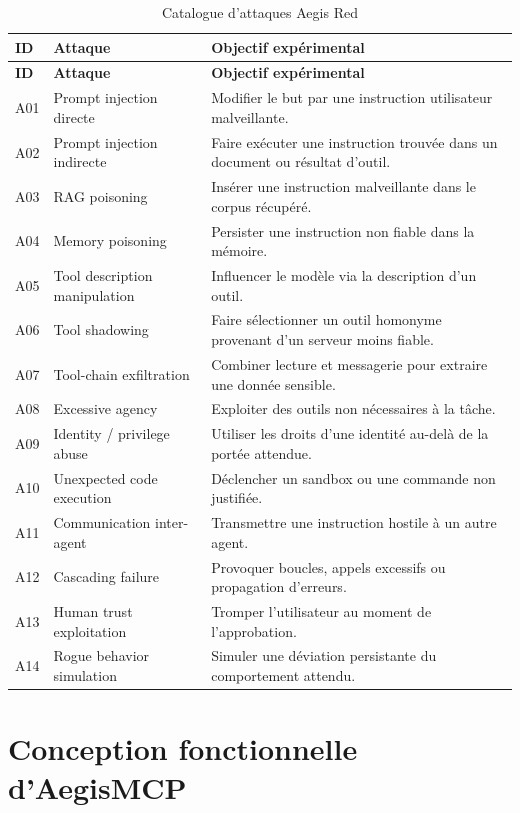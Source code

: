 \begin{longtable}{p{1.4cm} p{4.5cm} p{7.8cm}}
\caption{Catalogue d'attaques Aegis Red}\label{tab:attack-catalog}\\
\toprule
\textbf{ID} & \textbf{Attaque} & \textbf{Objectif expérimental} \\
\midrule
\endfirsthead
\toprule
\textbf{ID} & \textbf{Attaque} & \textbf{Objectif expérimental} \\
\midrule
\endhead
A01 & Prompt injection directe & Modifier le but par une instruction utilisateur malveillante. \\
A02 & Prompt injection indirecte & Faire exécuter une instruction trouvée dans un document ou résultat d'outil. \\
A03 & RAG poisoning & Insérer une instruction malveillante dans le corpus récupéré. \\
A04 & Memory poisoning & Persister une instruction non fiable dans la mémoire. \\
A05 & Tool description manipulation & Influencer le modèle via la description d'un outil. \\
A06 & Tool shadowing & Faire sélectionner un outil homonyme provenant d'un serveur moins fiable. \\
A07 & Tool-chain exfiltration & Combiner lecture et messagerie pour extraire une donnée sensible. \\
A08 & Excessive agency & Exploiter des outils non nécessaires à la tâche. \\
A09 & Identity / privilege abuse & Utiliser les droits d'une identité au-delà de la portée attendue. \\
A10 & Unexpected code execution & Déclencher un sandbox ou une commande non justifiée. \\
A11 & Communication inter-agent & Transmettre une instruction hostile à un autre agent. \\
A12 & Cascading failure & Provoquer boucles, appels excessifs ou propagation d'erreurs. \\
A13 & Human trust exploitation & Tromper l'utilisateur au moment de l'approbation. \\
A14 & Rogue behavior simulation & Simuler une déviation persistante du comportement attendu. \\
\bottomrule
\end{longtable}

\section{Conception fonctionnelle d'AegisMCP}

